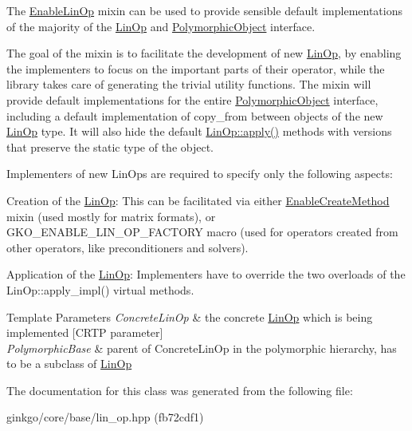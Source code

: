 The \hyperlink{classgko_1_1EnableLinOp}{Enable\+Lin\+Op} mixin can be used to provide sensible default implementations of the majority of the \hyperlink{classgko_1_1LinOp}{Lin\+Op} and \hyperlink{classgko_1_1PolymorphicObject}{Polymorphic\+Object} interface. 

The goal of the mixin is to facilitate the development of new \hyperlink{classgko_1_1LinOp}{Lin\+Op}, by enabling the implementers to focus on the important parts of their operator, while the library takes care of generating the trivial utility functions. The mixin will provide default implementations for the entire \hyperlink{classgko_1_1PolymorphicObject}{Polymorphic\+Object} interface, including a default implementation of {\ttfamily copy\+\_\+from} between objects of the new \hyperlink{classgko_1_1LinOp}{Lin\+Op} type. It will also hide the default \hyperlink{classgko_1_1LinOp_a0449b2fc705d2f970855af23b5e2788e}{Lin\+Op\+::apply()} methods with versions that preserve the static type of the object.

Implementers of new Lin\+Ops are required to specify only the following aspects\+:


\begin{DoxyEnumerate}
\item Creation of the \hyperlink{classgko_1_1LinOp}{Lin\+Op}\+: This can be facilitated via either \hyperlink{classgko_1_1EnableCreateMethod}{Enable\+Create\+Method} mixin (used mostly for matrix formats), or G\+K\+O\+\_\+\+E\+N\+A\+B\+L\+E\+\_\+\+L\+I\+N\+\_\+\+O\+P\+\_\+\+F\+A\+C\+T\+O\+RY macro (used for operators created from other operators, like preconditioners and solvers).
\item Application of the \hyperlink{classgko_1_1LinOp}{Lin\+Op}\+: Implementers have to override the two overloads of the Lin\+Op\+::apply\+\_\+impl() virtual methods.
\end{DoxyEnumerate}


\begin{DoxyTemplParams}{Template Parameters}
{\em Concrete\+Lin\+Op} & the concrete \hyperlink{classgko_1_1LinOp}{Lin\+Op} which is being implemented \mbox{[}C\+R\+TP parameter\mbox{]} \\
\hline
{\em Polymorphic\+Base} & parent of Concrete\+Lin\+Op in the polymorphic hierarchy, has to be a subclass of \hyperlink{classgko_1_1LinOp}{Lin\+Op} \\
\hline
\end{DoxyTemplParams}


The documentation for this class was generated from the following file\+:\begin{DoxyCompactItemize}
\item 
ginkgo/core/base/lin\+\_\+op.\+hpp (fb72cdf1)\end{DoxyCompactItemize}
